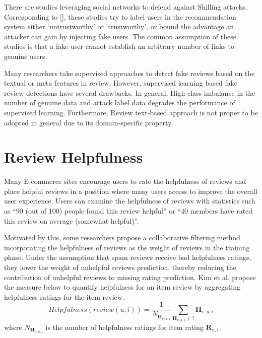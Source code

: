 \documentclass[master,english,final]{kaist-ucs}
\begin{document}
There are studies  leveraging social networks to defend against Shilling attacks.
Corresponding to [], these studies try to label users in the recommendation system either ‘untrustworthy’ or ‘trustworthy’, or bound the advantage an attacker can gain by injecting fake users. The common assumption of these studies is that a fake user cannot establish an arbitrary number of links to genuine users.

Many researchers take supervised approaches to detect fake reviews based on the textual or meta features in review.
However, supervised learning based fake review detections have several drawbacks.
In general, High class imbalance in the number of genuine data and attack label data degrades the performance of supervised learning.
Furthermore, Review text-based approach is not proper to be adopted in general due to its domain-specific property.

\section{Review Helpfulness}
Many E-commerce sites encourage users to rate the helpfulness of reviews and place helpful reviews in a position where many users access to improve the overall user experience.
Users can examine the helpfulness of reviews with statistics such as “90 (out of 100) people found this review helpful” or “40 members have rated this review on average (somewhat helpful)”.

Motivated by this, some researchers \cite{RQMF} propose a collaborative filtering method incorporating the helpfulness of reviews as the weight of reviews in the training phase.
Under the assumption that spam reviews receive bad helpfulness ratings, they lower the weight of unhelpful reviews prediction, thereby reducing the contribution of unhelpful reviews to missing rating prediction.
Kim et al. \cite{naive_helpfulness} propose the measure below to quantify helpfulness for an item review by aggregating helpfulness ratings for the item review.
\begin{equation}
Helpfulness(review (u,i))=\frac{1} {N_{\bm{H}_{v,u,i}}} \sum_{\bm{H}_{v,u,i} \neq ?} \bm{H}_{v,u,i}
\end{equation}
where $N_{\bm{H}_{v,u,i}}$ is the number of helpfulness ratings for item rating $\bm{R}_{u,i}$.
\end{document}
